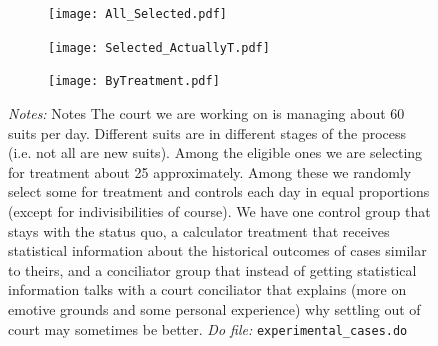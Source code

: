 \documentclass[11pt]{article}
\begin{document}
      
\begin{figure}[H]
\caption{Number of experimental cases: overall, selected and actually treated.}
\label{treatmentunits}
\begin{center}
    \begin{subfigure}{0.49\textwidth}
        \caption{}
        \centering
        \texttt{[image: All\_Selected.pdf]}
    \end{subfigure}
    \begin{subfigure}{0.49\textwidth}
        \caption{}
        \centering
        \texttt{[image: Selected\_ActuallyT.pdf]}
    \end{subfigure}
    \hfill
        \begin{subfigure}{0.49\textwidth}
            \caption{}
            \centering
            \texttt{[image: ByTreatment.pdf]}    
        \end{subfigure}
    \end{center}
     {\footnotesize \textit{Notes: } Notes 
    The court we are working on is managing about 60 suits per day. Different suits are in different stages of the process (i.e. not all are new suits). Among the eligible ones we are selecting for treatment about 25 approximately. Among these we randomly select some for treatment and controls each day in equal proportions (except for indivisibilities of course). We have one control group that stays with the status quo, a calculator treatment that receives statistical information about the historical outcomes of cases similar to theirs, and a conciliator group that instead of getting statistical information talks with a court conciliator that explains (more on emotive grounds and some personal experience) why settling out of court may sometimes be better.}
      {\footnotesize \textit{Do file: }  \texttt{experimental\_cases.do}}
\end{figure}
\end{document}
